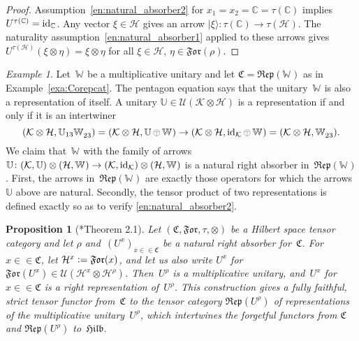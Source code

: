 \documentclass[a4paper]{amsart}
\numberwithin{equation}{section}
\theoremstyle{plain}
\numberwithin{theorem}{section}
\newtheorem{proposition}[theorem]{Proposition}
\theoremstyle{definition}
\theoremstyle{remark}
\newtheorem{example}[theorem]{Example}
\newcommand{\tenscorep}{\mathbin{\begin{tikzpicture}[baseline,x=.75ex,y=.75ex] \draw[line width=.2pt] (-0.8,1.15)--(0.8,1.15);\draw[line width=.2pt](0,-0.25)--(0,1.15); \draw[line width=.2pt] (0,0.75) circle [radius = 1];\end{tikzpicture}}}
\newcommand*{\Corep}[1]{\mathbb{#1}}          %
\newcommand*{\ket}[1]{\lvert#1\rangle}%
\newcommand*{\inOb}{\mathrel{\in\in}}%
\newcommand*{\Cat}{\mathfrak C}     %
\newcommand*{\Hilb}{\mathfrak{Hilb}}%
\newcommand*{\Corepcat}[1]{\mathfrak{Rep}(#1)}%
\newcommand*{\Forget}{\mathfrak{For}}%
\newcommand*{\Trivial}{\tau}%
\newcommand*{\C}{\mathbb C}
\newcommand*{\Id}{\textup{id}}%
\newcommand*{\Multunit}[1][]{\mathbb W^{#1}}%
\newcommand*{\Hils}[1][H]{\mathcal{#1}}%
\newcommand*{\U}{\mathcal U}%
\newcommand*{\defeq}{\mathrel{\vcentcolon=}}
\begin{document}
\begin{proof}
  Assumption~\ref{en:natural_absorber2} for
  \(x_1=x_2=\C=\Trivial(\C)\)
  implies \(U^{\Trivial(\C)} = \Id_{\C}\).
  Any vector \(\xi\in\Hils\)
  gives an arrow \(\ket{\xi}\colon \Trivial(\C)\to\Trivial(\Hils)\).
  The naturality assumption~\ref{en:natural_absorber1} applied to
  these arrows gives
  \(U^{\Trivial(\Hils)}(\xi\otimes\eta) = \xi\otimes\eta\)
  for all \(\xi\in\Hils\), \(\eta\in\Forget(\rho)\).
\end{proof}

\begin{example}
  \label{exa:Multunit_absorber}
  Let~\(\Multunit\)
  be a multiplicative unitary and let \(\Cat=\Corepcat{\Multunit}\)
  as in Example~\ref{exa:Corepcat}.  The pentagon equation says that
  the unitary~\(\Multunit\)
  is also a representation of itself.  A unitary
  \(\Corep{U}\in \U(\Hils[K]\otimes\Hils)\)
  is a representation if and only if it is an intertwiner
  \[
  (\Hils[K]\otimes\Hils,\Corep{U}_{13}\Multunit_{23})
  = (\Hils[K]\otimes\Hils,\Corep{U}\tenscorep\Multunit)
  \to (\Hils[K]\otimes\Hils, \Id_{\Hils[K]}\tenscorep\Multunit)
  = (\Hils[K]\otimes\Hils, \Multunit_{23}).
  \]
  We claim that~\(\Multunit\)
  with the family of arrows
  \(\Corep{U}\colon (\Hils[K],\Corep{U})\otimes (\Hils,\Multunit) \to
  (\Hils[K],\Id_{\Hils[K]})\otimes (\Hils,\Multunit)\)
  is a natural right absorber in~\(\Corepcat{\Multunit}\).
  First, the arrows in~\(\Corepcat{\Multunit}\)
  are exactly those operators for which the arrows~\(\Corep{U}\)
  above are natural.  Secondly, the tensor product of two
  representations is defined exactly so as to verify
  \ref{en:natural_absorber2}.
\end{example}

\begin{proposition}[\cite{Pinzari-Roberts:Regular}*{Theorem 2.1}]
  \label{pro:absorber}
  Let \((\Cat,\Forget,\Trivial,\otimes)\)
  be a Hilbert space tensor category and let \(\rho\)
  and~\((U^x)_{x\inOb\Cat}\)
  be a natural right absorber for~\(\Cat\).
  For \(x\inOb\Cat\),
  let \(\Hils^x \defeq \Forget(x)\),
  and let us also write \(U^x\)
  for \(\Forget(U^x)\in \U(\Hils^x\otimes\Hils^\rho)\).
  Then~\(U^\rho\)
  is a multiplicative unitary, and~\(U^x\)
  for \(x\inOb\Cat\)
  is a right representation of~\(U^\rho\).
  This construction gives a fully faithful, strict tensor functor
  from~\(\Cat\)
  to the tensor category \(\Corepcat{U^\rho}\)
  of representations of the multiplicative unitary~\(U^\rho\),
  which intertwines the forgetful functors from \(\Cat\) and
  \(\Corepcat{U^\rho}\) to~\(\Hilb\).
\end{proposition}
\end{document}
